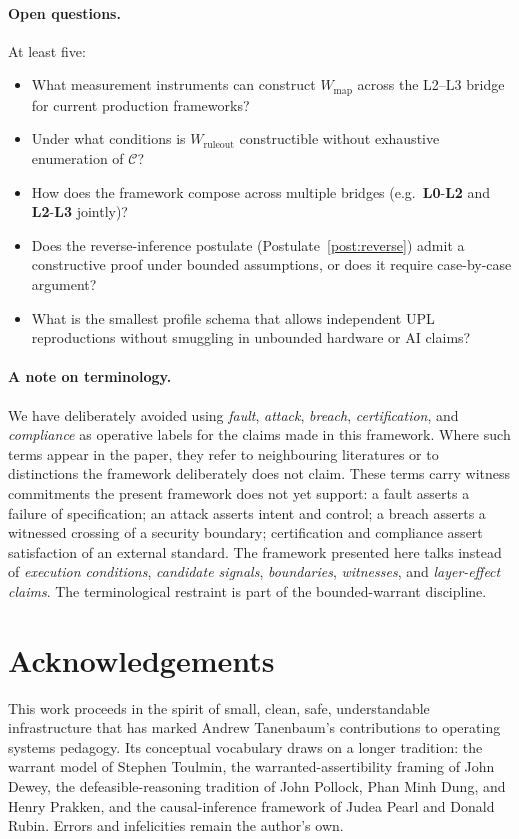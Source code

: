 \documentclass[11pt, a4paper]{article}
\theoremstyle{upldef}
\newcommand{\witness}[1]{\ensuremath{W_{\text{#1}}}}
\newcommand{\layer}[1]{\textbf{L#1}}
\begin{document}
\paragraph{Open questions.}
At least five:
\begin{itemize}
\item What measurement instruments can construct $\witness{map}$
across the L2--L3 bridge for current production frameworks?
\item Under what conditions is $\witness{ruleout}$ constructible
without exhaustive enumeration of $\mathcal{C}$?
\item How does the framework compose across multiple bridges
(e.g.\ \layer{0}-\layer{2} and \layer{2}-\layer{3} jointly)?
\item Does the reverse-inference postulate
(Postulate~\ref{post:reverse}) admit a constructive proof under
bounded assumptions, or does it require case-by-case argument?
\item What is the smallest profile schema that allows independent
UPL reproductions without smuggling in unbounded hardware or AI
claims?
\end{itemize}

\paragraph{A note on terminology.}
We have deliberately avoided using \emph{fault}, \emph{attack},
\emph{breach}, \emph{certification}, and \emph{compliance} as
operative labels for the claims made in this framework. Where such
terms appear in the paper, they refer to neighbouring literatures or
to distinctions the framework deliberately does not claim. These
terms carry witness commitments the present framework does not yet
support: a fault asserts a failure of specification; an attack
asserts intent and control; a breach asserts a witnessed crossing of
a security boundary; certification and compliance assert satisfaction
of an external standard. The framework presented here talks instead
of \emph{execution conditions}, \emph{candidate signals},
\emph{boundaries}, \emph{witnesses}, and \emph{layer-effect claims}.
The terminological restraint is part of the bounded-warrant
discipline.

\section*{Acknowledgements}

This work proceeds in the spirit of small, clean, safe,
understandable infrastructure that has marked Andrew Tanenbaum's
contributions to operating systems pedagogy. Its conceptual
vocabulary draws on a longer tradition: the warrant model of
Stephen Toulmin, the warranted-assertibility framing of John Dewey,
the defeasible-reasoning tradition of John Pollock, Phan Minh Dung,
and Henry Prakken, and the causal-inference framework of Judea
Pearl and Donald Rubin. Errors and infelicities remain the author's
own.


\end{document}
